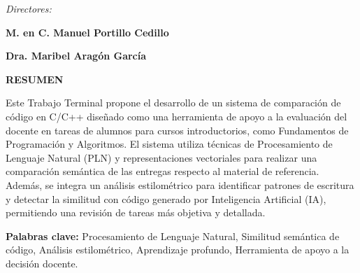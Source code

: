 \vspace{1.3cm}

\begin{center}
    \textit{Directores:}
\end{center}

\vspace{0.7cm}

\noindent
\begin{minipage}[t]{0.48\textwidth}
    \centering
    {\fontsize{14}{16}\selectfont \textbf{M. en C. Manuel Portillo Cedillo}}
\end{minipage}%
\hfill
\begin{minipage}[t]{0.48\textwidth}
    \centering
    {\fontsize{14}{16}\selectfont \textbf{Dra. Maribel Aragón García}}
\end{minipage}

\begin{center}
    \textbf{RESUMEN}
\end{center}


{\fontsize{10}{11}\selectfont
Este Trabajo Terminal propone el desarrollo de un sistema de comparación de código en C/C++ diseñado como una herramienta de apoyo a la evaluación del docente en tareas de alumnos para cursos introductorios, como Fundamentos de Programación y Algoritmos. El sistema utiliza técnicas de Procesamiento de Lenguaje Natural (PLN) y representaciones vectoriales para realizar una comparación semántica de las entregas respecto al material de referencia. Además, se integra un análisis estilométrico para identificar patrones de escritura y detectar la similitud con código generado por Inteligencia Artificial (IA), permitiendo una revisión de tareas más objetiva y detallada.

\vspace{0.2cm}

\textbf{Palabras clave:} Procesamiento de Lenguaje Natural, Similitud semántica de código, Análisis estilométrico, Aprendizaje profundo, Herramienta de apoyo a la decisión docente.

\vspace{0.8cm}
}

\endgroup
